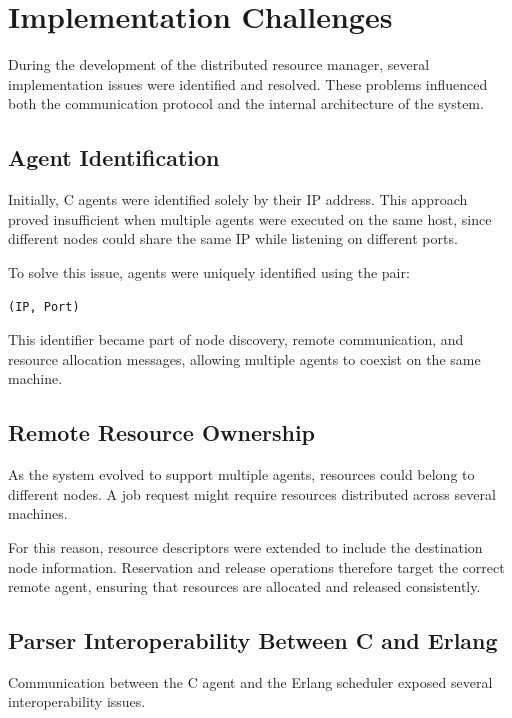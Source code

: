 \documentclass[12pt,a4paper]{article}
\begin{document}
\section{Implementation Challenges}

During the development of the distributed resource manager, several implementation issues were identified and resolved. These problems influenced both the communication protocol and the internal architecture of the system.

\subsection{Agent Identification}

Initially, C agents were identified solely by their IP address. This approach proved insufficient when multiple agents were executed on the same host, since different nodes could share the same IP while listening on different ports.

To solve this issue, agents were uniquely identified using the pair:

\begin{center}
\texttt{(IP, Port)}
\end{center}

This identifier became part of node discovery, remote communication, and resource allocation messages, allowing multiple agents to coexist on the same machine.

\subsection{Remote Resource Ownership}

As the system evolved to support multiple agents, resources could belong to different nodes. A job request might require resources distributed across several machines.

For this reason, resource descriptors were extended to include the destination node information. Reservation and release operations therefore target the correct remote agent, ensuring that resources are allocated and released consistently.

\subsection{Parser Interoperability Between C and Erlang}

Communication between the C agent and the Erlang scheduler exposed several interoperability issues.
\end{document}
